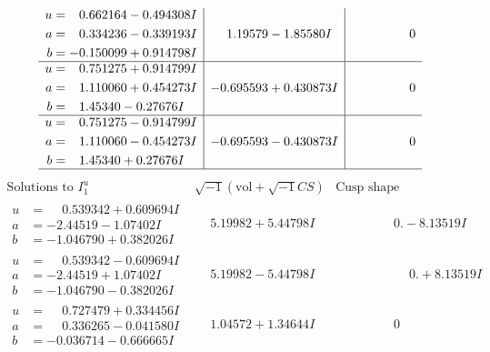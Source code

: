 \documentclass[1p]{elsarticle_modified}
\theoremstyle{definition}
\newcommand{\I}{\sqrt{-1}}
\begin{document}
$$\begin{array}{c|c|c}
\begin{aligned}
u &= \phantom{-}0.662164 - 0.494308 I \\
a &= \phantom{-}0.334236 - 0.339193 I \\
b &= -0.150099 + 0.914798 I\end{aligned}
 & \phantom{-}1.19579 - 1.85580 I & \phantom{-0.000000 } 0 \\ \hline\begin{aligned}
u &= \phantom{-}0.751275 + 0.914799 I \\
a &= \phantom{-}1.110060 + 0.454273 I \\
b &= \phantom{-}1.45340 - 0.27676 I\end{aligned}
 & -0.695593 + 0.430873 I & \phantom{-0.000000 } 0 \\ \hline\begin{aligned}
u &= \phantom{-}0.751275 - 0.914799 I \\
a &= \phantom{-}1.110060 - 0.454273 I \\
b &= \phantom{-}1.45340 + 0.27676 I\end{aligned}
 & -0.695593 - 0.430873 I & \phantom{-0.000000 } 0\\
 \hline 
 \end{array}$$\newpage$$\begin{array}{c|c|c}  
\text{Solutions to }I^u_{1}& \I (\text{vol} + \sqrt{-1}CS) & \text{Cusp shape}\\
 \hline 
\begin{aligned}
u &= \phantom{-}0.539342 + 0.609694 I \\
a &= -2.44519 - 1.07402 I \\
b &= -1.046790 + 0.382026 I\end{aligned}
 & \phantom{-}5.19982 + 5.44798 I & \phantom{-0.000000 } 0. - 8.13519 I \\ \hline\begin{aligned}
u &= \phantom{-}0.539342 - 0.609694 I \\
a &= -2.44519 + 1.07402 I \\
b &= -1.046790 - 0.382026 I\end{aligned}
 & \phantom{-}5.19982 - 5.44798 I & \phantom{-0.000000 -}0. + 8.13519 I \\ \hline\begin{aligned}
u &= \phantom{-}0.727479 + 0.334456 I \\
a &= \phantom{-}0.336265 - 0.041580 I \\
b &= -0.036714 - 0.666665 I\end{aligned}
 & \phantom{-}1.04572 + 1.34644 I & \phantom{-0.000000 } 0 \\ \hline\begin{aligned}

\end{aligned}
\end{array}$$
\end{document}
